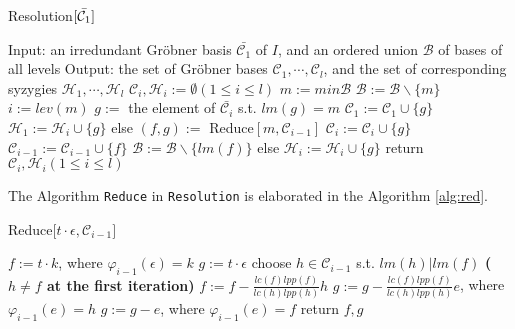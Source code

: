 \documentclass{article}
\theoremstyle{definition}
\theoremstyle{remark}
\theoremstyle{example}
\begin{document}
\begin{algorithm}[H]
\caption{Resolution$[\bar{{\mathcal{C}}\sb{1}}]$}\label{alg:res}
    \begin{algorithmic}
        \State Input: an irredundant Gröbner basis $\bar{{\mathcal{C}}_{1}}$ of $I$, and an ordered union $\mathcal{B}$ of bases of all levels
        \State Output: the set of Gröbner bases $\mathcal{C}_{1},\cdots,\mathcal{C}_{l}$, and the set of corresponding syzygies $\mathcal{H}_{1},\cdots,\mathcal{H}_{l}$
        \newline
        \State ${\mathcal{C}}_{i},{\mathcal{H}}_{i}:=\emptyset (1\leq i\leq l)$
            \State $m:=min\mathcal{B}$
            \State $\mathcal{B}:=\mathcal{B}\backslash\{m\}$
            \State $i:=lev(m)$
                \State $g:=$ the element of $\bar{{\mathcal{C}}_{i}}$ s.t. $lm(g)=m$
                \State ${\mathcal{C}}_{1}:={\mathcal{C}}_{1}\cup\{g\}$
                \State ${\mathcal{H}}_{1}:={\mathcal{H}}_{i}\cup\{g\}$
            \State else
                \State $(f,g):=$ Reduce$[m,{\mathcal{C}}_{i-1}]$
                \State ${\mathcal{C}}_{i}:={\mathcal{C}}_{i}\cup\{g\}$
                    \State ${\mathcal{C}}_{i-1}:={\mathcal{C}}_{i-1}\cup\{f\}$
                    \State $\mathcal{B}:=\mathcal{B}\backslash\{lm(f)\}$
                \State else
                    \State ${\mathcal{H}}_{i}:={\mathcal{H}}_{i}\cup\{g\}$
                \EndIf
            \EndIf
        \EndWhile
        \State return ${\mathcal{C}}_{i},{\mathcal{H}}_{i}(1\leq i\leq l)$
        \end{algorithmic}
\end{algorithm}

The Algorithm \verb+Reduce+ in \verb+Resolution+ is elaborated in the Algorithm \ref{alg:red}.

\begin{algorithm}[H]
\caption{Reduce[$t\cdot \epsilon,\mathcal{C}_{i-1}]$}\label{alg:red}
    \begin{algorithmic}
    \State $f:=t\cdot k$, where $\varphi_{i-1}(\epsilon) = k$
    \State $g:=t\cdot \epsilon$
        \State choose  $h \in \mathcal{C}_{i-1}$ s.t. $lm(h)\vert lm(f)$  \textbf{($h \neq f$ at the first iteration)}
        \State $f := f - \tfrac{lc(f)lpp(f)}{lc(h)lpp(h)}h$
        \State $g := g - \tfrac{lc(f)lpp(f)}{lc(h)lpp(h)}e$, where $\varphi_{i-1}(e) = h$
    \EndWhile
        \State $g := g - e$, where $\varphi_{i-1}(e) = f$
    \EndIf
    \State return $f,g$
    \end{algorithmic}
\end{algorithm}
\end{document}
